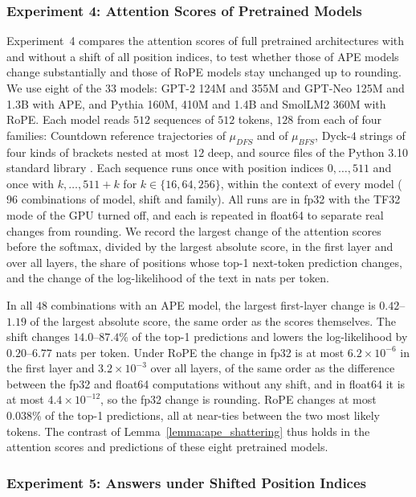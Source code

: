 \subsubsection{Experiment 4: Attention Scores of Pretrained Models}
\label{app:c1-kernel}

Experiment~4 compares the attention scores of full pretrained architectures with and without a shift of all position indices, to test whether those of APE models change substantially and those of RoPE models stay unchanged up to rounding. We use eight of the $33$ models: GPT-2 124M and 355M and GPT-Neo 125M and 1.3B with APE, and Pythia 160M, 410M and 1.4B and SmolLM2 360M with RoPE. Each model reads $512$ sequences of $512$ tokens, $128$ from each of four families: Countdown reference trajectories of $\mu_{DFS}$ and of $\mu_{BFS}$, Dyck-$4$ strings of four kinds of brackets nested at most $12$ deep, and source files of the Python 3.10 standard library \citep{cpython31019}. Each sequence runs once with position indices $0,\dots,511$ and once with $k,\dots,511+k$ for $k\in\{16,64,256\}$, within the context of every model ($96$ combinations of model, shift and family). All runs are in fp32 with the TF32 mode of the GPU turned off, and each is repeated in float64 to separate real changes from rounding. We record the largest change of the attention scores before the softmax, divided by the largest absolute score, in the first layer and over all layers, the share of positions whose top-1 next-token prediction changes, and the change of the log-likelihood of the text in nats per token.

In all $48$ combinations with an APE model, the largest first-layer change is $0.42$--$1.19$ of the largest absolute score, the same order as the scores themselves. The shift changes $14.0$--$87.4\%$ of the top-1 predictions and lowers the log-likelihood by $0.20$--$6.77$ nats per token. Under RoPE the change in fp32 is at most $6.2\times10^{-6}$ in the first layer and $3.2\times10^{-3}$ over all layers, of the same order as the difference between the fp32 and float64 computations without any shift, and in float64 it is at most $4.4\times10^{-12}$, so the fp32 change is rounding. RoPE changes at most $0.038\%$ of the top-1 predictions, all at near-ties between the two most likely tokens. The contrast of Lemma~\ref{lemma:ape_shattering} thus holds in the attention scores and predictions of these eight pretrained models.

\subsubsection{Experiment 5: Answers under Shifted Position Indices}
\label{app:serving}

